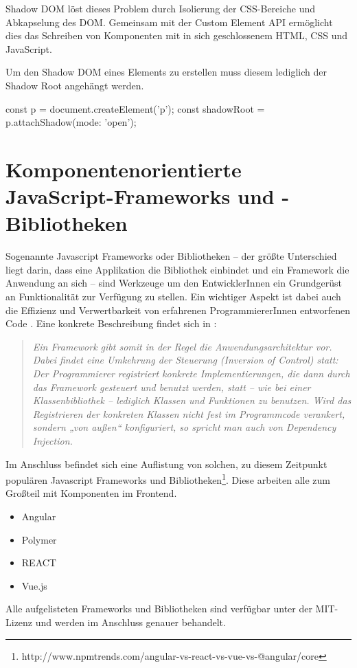 Shadow DOM löst dieses Problem durch Isolierung der CSS-Bereiche und Abkapselung des DOM. 
Gemeinsam mit der Custom Element API ermöglicht dies das Schreiben von Komponenten mit in sich geschlossenem HTML, CSS und JavaScript.


Um den Shadow DOM eines Elements zu erstellen muss diesem lediglich der Shadow Root angehängt werden.
\begin{JsCode}
	const p = document.createElement('p');
	const shadowRoot = p.attachShadow({mode: 'open'});
\end{JsCode}
\section{Komponentenorientierte JavaScript-Frameworks und -Bibliotheken}
Sogenannte Javascript Frameworks oder Bibliotheken -- der größte Unterschied liegt darin, dass eine Applikation die Bibliothek einbindet und ein Framework die Anwendung an sich -- sind Werkzeuge um den EntwicklerInnen ein Grundgerüst an Funktionalität zur Verfügung zu stellen. Ein wichtiger Aspekt ist dabei auch die Effizienz und Verwertbarkeit von erfahrenen ProgrammiererInnen entworfenen Code \cite{js-frameworks}.
Eine konkrete Beschreibung findet sich in \cite{wiki-framework}: 
\begin{quote}\textit{Ein Framework gibt somit in der Regel die Anwendungsarchitektur vor. Dabei findet eine Umkehrung der Steuerung (Inversion of Control) statt: Der Programmierer registriert konkrete Implementierungen, die dann durch das Framework gesteuert und benutzt werden, statt -- wie bei einer Klassenbibliothek -- lediglich Klassen und Funktionen zu benutzen. Wird das Registrieren der konkreten Klassen nicht fest im Programmcode verankert, sondern „von außen“ konfiguriert, so spricht man auch von Dependency Injection.}
\end{quote}

Im Anschluss befindet sich eine Auflistung von solchen, zu diesem Zeitpunkt populären Javascript Frameworks und Bibliotheken\footnote{http://www.npmtrends.com/angular-vs-react-vs-vue-vs-@angular/core}. Diese arbeiten alle zum Großteil mit Komponenten im Frontend.
\begin{itemize}  
	\item Angular
	\item Polymer
	\item REACT
	\item Vue.js
\end{itemize}
Alle aufgelisteten Frameworks und Bibliotheken sind verfügbar unter der MIT-Lizenz und werden im Anschluss genauer behandelt.

